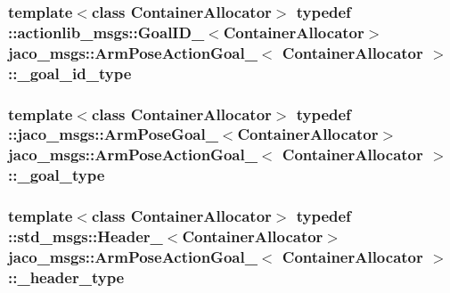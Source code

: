 \subsubsection[{\texorpdfstring{\+\_\+goal\+\_\+id\+\_\+type}{_goal_id_type}}]{\setlength{\rightskip}{0pt plus 5cm}template$<$class Container\+Allocator$>$ typedef \+::actionlib\+\_\+msgs\+::\+Goal\+I\+D\+\_\+$<$Container\+Allocator$>$ {\bf jaco\+\_\+msgs\+::\+Arm\+Pose\+Action\+Goal\+\_\+}$<$ Container\+Allocator $>$\+::{\bf \+\_\+goal\+\_\+id\+\_\+type}}\hypertarget{structjaco__msgs_1_1ArmPoseActionGoal___a9135f1a63598eb8454905638ce80bff5}{}\label{structjaco__msgs_1_1ArmPoseActionGoal___a9135f1a63598eb8454905638ce80bff5}
\subsubsection[{\texorpdfstring{\+\_\+goal\+\_\+type}{_goal_type}}]{\setlength{\rightskip}{0pt plus 5cm}template$<$class Container\+Allocator$>$ typedef \+::{\bf jaco\+\_\+msgs\+::\+Arm\+Pose\+Goal\+\_\+}$<$Container\+Allocator$>$ {\bf jaco\+\_\+msgs\+::\+Arm\+Pose\+Action\+Goal\+\_\+}$<$ Container\+Allocator $>$\+::{\bf \+\_\+goal\+\_\+type}}\hypertarget{structjaco__msgs_1_1ArmPoseActionGoal___af13ef7dee9d0b00a56d9fca8c439a3d0}{}\label{structjaco__msgs_1_1ArmPoseActionGoal___af13ef7dee9d0b00a56d9fca8c439a3d0}
\subsubsection[{\texorpdfstring{\+\_\+header\+\_\+type}{_header_type}}]{\setlength{\rightskip}{0pt plus 5cm}template$<$class Container\+Allocator$>$ typedef \+::std\+\_\+msgs\+::\+Header\+\_\+$<$Container\+Allocator$>$ {\bf jaco\+\_\+msgs\+::\+Arm\+Pose\+Action\+Goal\+\_\+}$<$ Container\+Allocator $>$\+::{\bf \+\_\+header\+\_\+type}}\hypertarget{structjaco__msgs_1_1ArmPoseActionGoal___aacdb1a8727f44b8684f1df0564c60ce6}{}\label{structjaco__msgs_1_1ArmPoseActionGoal___aacdb1a8727f44b8684f1df0564c60ce6}
